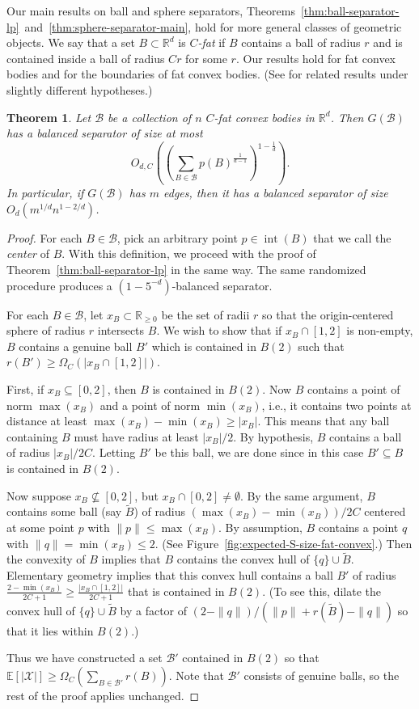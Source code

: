 \documentclass[11pt, reqno]{amsart}
\theoremstyle{plain}
\newtheorem{theorem}{Theorem}
\theoremstyle{definition}
\theoremstyle{remark}
\numberwithin{theorem}{section}
\numberwithin{equation}{section}
\newcommand{\paren}[1]{\left( #1 \right)}
\newcommand{\E}{\mathbb E}
\newcommand{\R}{\mathbb R}
\newcommand{\fB}{\mathcal B}
\newcommand{\fX}{\mathcal X}
\DeclareMathOperator{\inter}{int}
\begin{document}
Our main results on ball and sphere separators, Theorems~\ref{thm:ball-separator-lp}~and~\ref{thm:sphere-separator-main}, hold for more general classes of geometric objects. We say that a set $B\subset\R^d$ is \emph{$C$-fat} if $B$ contains a ball of radius $r$ and is contained inside a ball of radius $Cr$ for some $r$. Our results hold for fat convex bodies and for the boundaries of fat convex bodies. (See \cite{HQ17,BBKMZ20} for related results under slightly different hypotheses.)

\begin{theorem}
\label{thm:ball-separator-fat-convex}
Let $\fB$ be a collection of $n$ $C$-fat convex bodies in $\R^d$. Then $G(\fB)$ has a balanced separator of size at most
\[O_{d,C}\paren{\paren{\sum_{B\in\fB}p(B)^{\tfrac1{d-1}}}^{1-\tfrac1d}}.\]
In particular, if $G(\fB)$ has $m$ edges, then it has a balanced separator of size $O_{d}(m^{1/d}n^{1-2/d})$.
\end{theorem}

\begin{proof}
For each $B\in\fB$, pick an arbitrary point $p\in\inter(B)$ that we call the \emph{center} of $B$. With this definition, we proceed with the proof of Theorem~\ref{thm:ball-separator-lp} in the same way. The same randomized procedure produces a $(1-5^{-d})$-balanced separator.

For each $B\in\fB$, let $x_B\subset\R_{\geqslant0}$ be the set of radii $r$ so that the origin-centered sphere of radius $r$ intersects $B$. We wish to show that if $x_B\cap[1,2]$ is non-empty, $B$ contains a genuine ball $B'$ which is contained in $B(2)$ such that $r(B')\geq\Omega_C\paren{|x_B\cap[1,2]|}$.

First, if $x_B\subseteq[0,2]$, then $B$ is contained in $B(2)$. Now $B$ contains a point of norm $\max(x_B)$ and a point of norm $\min(x_B)$, i.e., it contains two points at distance at least $\max(x_B)-\min(x_B)\geq |x_B|$. This means that any ball containing $B$ must have radius at least $|x_B|/2$. By hypothesis, $B$ contains a ball of radius $|x_B|/2C$. Letting $B'$ be this ball, we are done since in this case $B'\subseteq B$ is contained in $B(2)$.

Now suppose $x_B\not\subseteq[0,2]$, but $x_B\cap [0,2]\neq\emptyset$. By the same argument, $B$ contains some ball (say $\tilde B$) of radius $(\max(x_B)-\min(x_B))/2C$ centered at some point $p$ with $\|p\|\leq \max(x_B)$. By assumption, $B$ contains a point $q$ with $\|q\|=\min(x_B)\leq 2$. (See Figure~\ref{fig:expected-S-size-fat-convex}.) Then the convexity of $B$ implies that $B$ contains the convex hull of $\{q\}\cup\tilde B$. Elementary geometry implies that this convex hull contains a ball $B'$ of radius $\tfrac{2-\min(x_B)}{2C+1}\geq \tfrac{|x_B\cap[1,2]|}{2C+1}$ that is contained in $B(2)$. (To see this, dilate the convex hull of $\{q\}\cup\tilde B$ by a factor of $(2-\|q\|)/(\|p\|+r(\tilde B)-\|q\|)$ so that it lies within $B(2)$.) 

Thus we have constructed a set $\fB'$ contained in $B(2)$ so that $\E[|\fX|]\geq\Omega_C\paren{\sum_{B\in\fB'}r(B)}$. Note that $\fB'$ consists of genuine balls, so the rest of the proof applies unchanged.
\end{proof}
\end{document}
